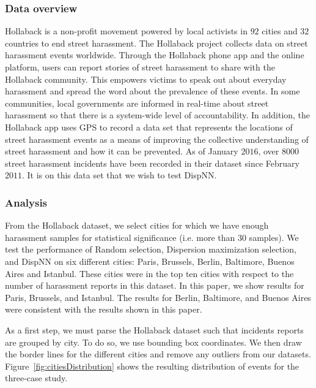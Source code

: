 \documentclass{acm_proc_article-sp}
\begin{document}
\subsubsection{Data overview}
Hollaback is a non-profit movement powered by local activists in $92$ cities and $32$ countries to end street harassment. The Hollaback project collects data on street harassment events worldwide. Through the Hollaback phone app and the online platform, users can report stories of street harassment to share with the Hollaback community. This empowers victims to speak out about everyday harassment and spread the word about the prevalence of these events. In some communities, local governments are informed in real-time about street harassment so that there is a system-wide level of accountability. In addition, the Hollaback app uses GPS to record a data set that represents the locations of street harassment events as a means of improving the collective understanding of street harassment and how it can be prevented.  As of January $2016$, over $8000$ street harassment incidents have been recorded in their dataset since February $2011$.  It is on this data set that we wish to test DispNN.\par
\subsubsection{Analysis}
From the Hollaback dataset, we select cities for which we have enough harassment samples for statistical significance (i.e. more than 30 samples). We test the performance of Random selection, Dispersion maximization selection, and DispNN on six different cities: Paris, Brussels, Berlin, Baltimore, Buenos Aires and Istanbul. These cities were in the top ten cities with respect to the number of harassment reports in this dataset. In this paper, we show results for Paris, Brussels, and Istanbul. The results for Berlin, Baltimore, and Buenos Aires were consistent with the results shown in this paper. \par

As a first step, we must parse the Hollaback dataset such that incidents reports are grouped by city. To do so, we use bounding box coordinates. We then draw the border lines for the different cities and remove any outliers from our datasets. Figure~\ref{fig:citiesDistribution} shows the resulting distribution of events for the three-case study. \par
\end{document}
